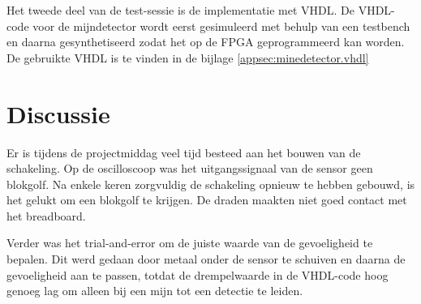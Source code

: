 \documentclass{report}
\begin{document}
\noindent Het tweede deel van de test-sessie is de implementatie met VHDL. De VHDL-code voor de mijndetector wordt eerst gesimuleerd met behulp van een testbench en daarna gesynthetiseerd zodat het op de FPGA geprogrammeerd kan worden. De gebruikte VHDL is te vinden in de bijlage \ref{appsec:minedetector.vhdl}

\section{Discussie}
Er is tijdens de projectmiddag veel tijd besteed aan het bouwen van de schakeling. Op de oscilloscoop was het uitgangssignaal van de sensor geen blokgolf. Na enkele keren zorgvuldig de schakeling opnieuw te hebben gebouwd, is het gelukt om een blokgolf te krijgen. De draden maakten niet goed contact met het breadboard.

Verder was het trial-and-error om de juiste waarde van de gevoeligheid te bepalen. Dit werd gedaan door metaal onder de sensor te schuiven en daarna de gevoeligheid aan te passen, totdat de drempelwaarde in de VHDL-code hoog genoeg lag om alleen bij een mijn tot een detectie te leiden.
\end{document}
